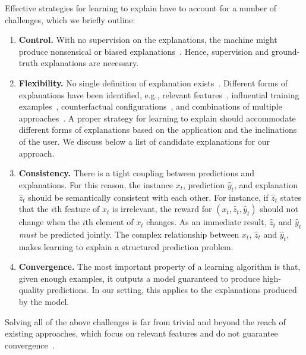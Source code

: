 \documentclass[letterpaper]{article} %
\begin{document}
Effective strategies for learning to explain have to account for a number of challenges, which we briefly outline:
%
\begin{enumerate}%
    \item \textbf{Control.} With no supervision on the explanations, the machine might produce nonsensical or biased explanations~\cite{lapuschkin2019unmasking,ross2017right,schramowski2020right}. Hence, supervision and ground-truth explanations are necessary. 

    \item \textbf{Flexibility.} No single definition of explanation exists~\cite{miller2018explanation,guidotti2018survey}.
    Different forms of explanations have been identified, e.g., relevant features~\cite{ribeiro2016should}, influential training examples~\cite{koh2017understanding}, counterfactual configurations~\cite{guidotti2018local}, and combinations of multiple approaches~\cite{bogaerts2020step}.  A proper strategy for learning to explain should accommodate different forms of explanations based on the application and  the inclinations of the user. We discuss below a list of candidate explanations for our approach.

    \item \textbf{Consistency.}  There is a tight coupling between predictions and explanations.  For this reason, the instance $x_t$, prediction $\hat{y}_t$, and explanation $\hat{z}_t$ should be semantically consistent with each other.  For instance, if $\hat{z}_t$ states that the $i$th feature of $x_t$ is irrelevant, the reward for $(x_t, \hat{z}_t, \hat{y}_t)$ should not change when the $i$th element of $x_t$ changes. As an immediate result,  $\hat{z}_t$ and $\hat{y}_t$ \emph{must} be predicted jointly.  The complex relationship between $x_t$, $\hat{z}_t$ and $\hat{y}_t$,  makes learning to explain a structured prediction problem.

    \item \textbf{Convergence.}  The most important property of a learning algorithm is that, given enough examples, it outputs a model guaranteed to produce high-quality predictions.  In our setting, this applies to the explanations produced by the model.
    
\end{enumerate}
%
Solving all of the above challenges is far from trivial and beyond the reach of existing approaches, which focus on relevant features and do not guarantee convergence~\cite{schramowski2020right,lertvittayakumjorn2020find}.
\end{document}
